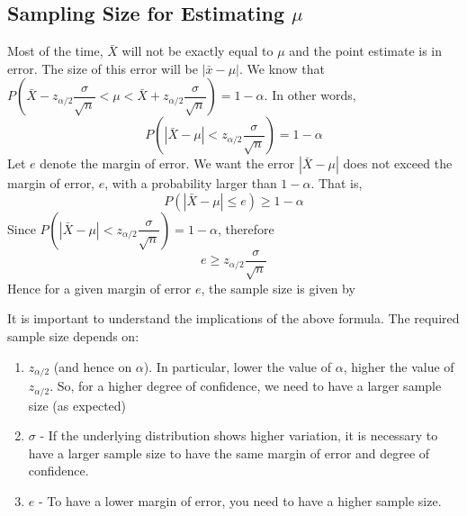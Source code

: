 \subsection{Sampling Size for Estimating $\mu$}
Most of the time, $\bar{X}$ will not be exactly equal to $\mu$ and the point estimate is in error. The size of this error will be $| \bar{x} - \mu |$. We know that 
$P\left( \bar{X} - z_{\alpha/2}\dfrac{\sigma}{\sqrt{n}} < \mu < \bar{X} + z_{\alpha/2}\dfrac{\sigma}{\sqrt{n}} \right ) = 1 - \alpha$. In other words, 
$$
P\left( |\bar{X} - \mu | < z_{\alpha/2} \dfrac{\sigma}{\sqrt{n}}\right) = 1 - \alpha
$$
Let $e$ denote the margin of error. We want the error $|\bar{X} - \mu |$ does not exceed the margin of error, $e$, with a probability larger than $1 - \alpha$. That is,
$$
P(|\bar{X} - \mu | \leq e) \geq 1 - \alpha
$$
Since $P\left( |\bar{X} - \mu | < z_{\alpha/2} \dfrac{\sigma}{\sqrt{n}}\right) = 1 - \alpha$, therefore
$$
e \geq z_{\alpha/2} \dfrac{\sigma}{\sqrt{n}}
$$
Hence for a given margin of error $e$, the sample size is given by
\begin{note}
\end{note}
It is important to understand the implications of the above formula. The required sample size depends on:
\begin{enumerate}
    \item $z_{\alpha/2}$ (and hence on $\alpha$). In particular, lower the value of $\alpha$, higher the value of $z_{\alpha/2}$. So, for a higher degree of confidence, we need to have a larger sample size (as expected)
    \item $\sigma$ - If the underlying distribution shows higher variation, it is necessary to have a larger sample size to have the same margin of error and degree of confidence.
    \item $e$ - To have a lower margin of error, you need to have a higher sample size.
\end{enumerate}
